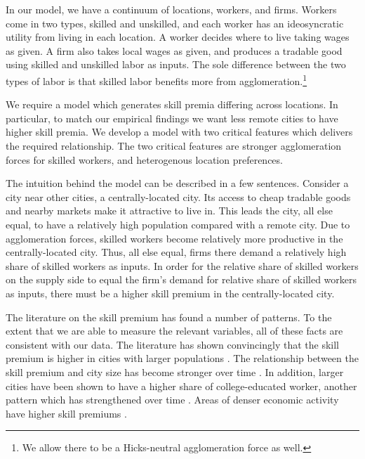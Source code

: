 \documentclass[12 pt]{article}
\begin{document}
In our model, we have a continuum of locations, workers, and firms.  Workers come in two types, skilled and unskilled, and each worker has an ideosyncratic utility from living in each location.  A worker decides where to live taking wages as given.  A firm also takes local wages as given, and produces a tradable good using skilled and unskilled labor as inputs.  The sole difference between the two types of labor is that skilled labor benefits more from agglomeration.\footnote{We allow there to be a Hicks-neutral agglomeration force as well.}

We require a model which generates skill premia differing across locations.  In particular, to match our empirical findings we want less remote cities to have higher skill premia.  We develop a model with two critical features which delivers the required relationship.   The two critical features are stronger agglomeration forces for skilled workers, and heterogenous location preferences.

The intuition behind the model can be described in a few sentences.  Consider a city near other cities, a centrally-located city.  Its access to cheap tradable goods and nearby markets make it attractive to live in.  This leads the city, all else equal, to have a relatively high population compared with a remote city.  Due to agglomeration forces, skilled workers become relatively more productive in the centrally-located city.  Thus, all else equal, firms there demand a relatively high share of skilled workers as inputs.  In order for the relative share of skilled workers on the supply side to equal the firm's demand for relative share of skilled workers as inputs, there must be a higher skill premium in the centrally-located city.

The literature on the skill premium has found a number of patterns.  To the extent that we are able to measure the relevant variables, all of these facts are consistent with our data.  The literature has shown convincingly that the skill premium is higher in cities with larger populations \citep{davis2012spatial}.  The relationship between the skill premium and city size has become stronger over time \citep{baum2013inequality, lindley2014spatial}.  In addition, larger cities have been shown to have a higher share of college-educated worker, another pattern which has strengthened over time \citep{moretti2008real, lindley2014spatial}.  Areas of denser economic activity have higher skill premiums \citep{combes2012sorting}.
\end{document}
